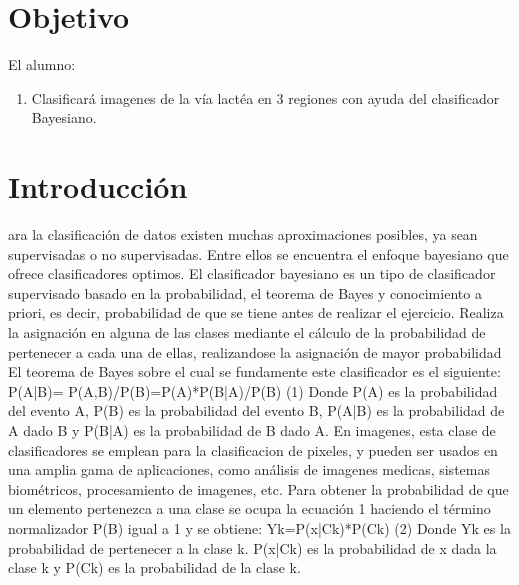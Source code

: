\documentclass[10pt,journal,compsoc]{IEEEtran}\usepackage[T1]{fontenc}                              %
\begin{document}
\section{Objetivo}

El alumno:

\begin{enumerate}
  \item Clasificará imagenes de la vía lactéa en 3 regiones con ayuda del clasificador Bayesiano.
\end{enumerate}



\section{Introducción}
 
ara la clasificación de datos existen muchas aproximaciones posibles, ya sean supervisadas o no supervisadas. Entre ellos se encuentra el enfoque bayesiano que ofrece clasificadores optimos.
El clasificador bayesiano es un tipo de clasificador supervisado basado en la probabilidad, el teorema de Bayes y conocimiento a priori, es decir, probabilidad de que se tiene antes de realizar el ejercicio. Realiza la asignación en alguna de las clases mediante el cálculo de la probabilidad de pertenecer a cada una de ellas, realizandose la asignación de mayor probabilidad
El teorema de Bayes sobre el cual se fundamente este clasificador es el siguiente:
P(A|B)= P(A,B)/P(B)=P(A)*P(B|A)/P(B)						(1)
Donde P(A) es la probabilidad del evento A, P(B) es la probabilidad del evento B, P(A|B) es la probabilidad de A dado B y P(B|A) es la probabilidad de B dado A.
En imagenes, esta clase de clasificadores se emplean para la clasificacion de pixeles, y pueden ser usados en una amplia gama de aplicaciones, como análisis de imagenes medicas, sistemas biométricos, procesamiento de imagenes, etc.
Para obtener la probabilidad de que un elemento pertenezca a una clase se ocupa la ecuación 1 haciendo el término normalizador P(B) igual a 1 y se obtiene:
Yk=P(x|Ck)*P(Ck)					(2)
Donde Yk es la probabilidad de pertenecer a la clase k.
P(x|Ck) es la probabilidad de x dada la clase k y P(Ck) es la probabilidad de la clase k.
\end{document}
